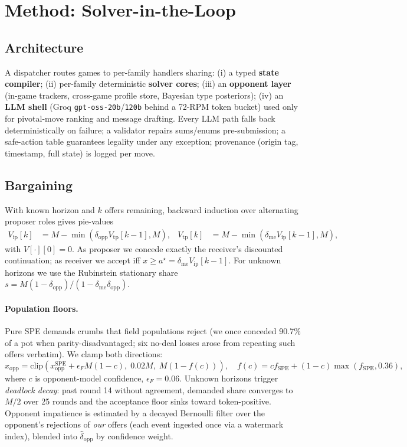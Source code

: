 \documentclass[11pt]{article}
\begin{document}
\section{Method: Solver-in-the-Loop}

\subsection{Architecture}
A dispatcher routes games to per-family handlers sharing: (i) a typed \textbf{state compiler}; (ii) per-family deterministic \textbf{solver cores}; (iii) an \textbf{opponent layer} (in-game trackers, cross-game profile store, Bayesian type posteriors); (iv) an \textbf{LLM shell} (Groq \texttt{gpt-oss-20b}/\texttt{120b} behind a 72-RPM token bucket) used only for pivotal-move ranking and message drafting. Every LLM path falls back deterministically on failure; a validator repairs sums/enums pre-submission; a safe-action table guarantees legality under any exception; provenance (origin tag, timestamp, full state) is logged per move.

\subsection{Bargaining}
With known horizon and $k$ offers remaining, backward induction over alternating proposer roles gives pie-values
\begin{align}
V_{\mathrm{ip}}[k] &= M - \min(\delta_{\mathrm{opp}} V_{\mathrm{tp}}[k{-}1], M), &
V_{\mathrm{tp}}[k] &= M - \min(\delta_{\mathrm{me}} V_{\mathrm{ip}}[k{-}1], M),
\end{align}
with $V[\cdot][0]=0$. As proposer we concede exactly the receiver's discounted continuation; as receiver we accept iff $x \ge a^\star = \delta_{\mathrm{me}} V_{\mathrm{ip}}[k{-}1]$. For unknown horizons we use the Rubinstein stationary share $s = M(1-\delta_{\mathrm{opp}})/(1-\delta_{\mathrm{me}}\delta_{\mathrm{opp}})$.

\paragraph{Population floors.} Pure SPE demands crumbs that field populations reject (we once conceded 90.7\% of a pot when parity-disadvantaged; six no-deal losses arose from repeating such offers verbatim). We clamp both directions:
\[
x_{\mathrm{opp}} = \mathrm{clip}\!\left(x^{\mathrm{SPE}}_{\mathrm{opp}} + \epsilon_F M(1-c),\; 0.02M,\; M(1 - f(c))\right),
\quad f(c) = c f_{\mathrm{SPE}} + (1{-}c)\max(f_{\mathrm{SPE}}, 0.36),
\]
where $c$ is opponent-model confidence, $\epsilon_F{=}0.06$. Unknown horizons trigger \emph{deadlock decay}: past round 14 without agreement, demanded share converges to $M/2$ over 25 rounds and the acceptance floor sinks toward token-positive. Opponent impatience is estimated by a decayed Bernoulli filter over the opponent's rejections of \emph{our} offers (each event ingested once via a watermark index), blended into $\hat\delta_{\mathrm{opp}}$ by confidence weight.
\end{document}
